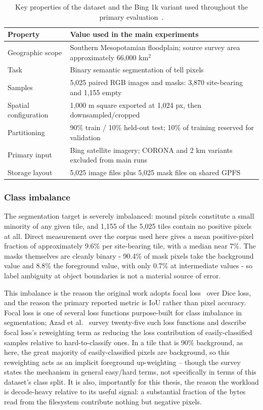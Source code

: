 \begin{table}[!ht]
\centering
\begin{tabularx}{\linewidth}{lL}
\toprule
Property & Value used in the main experiments \\
\midrule
Geographic scope & Southern Mesopotamian floodplain; source survey area approximately
66,000 km$^2$~\cite{Casini23} \\
Task & Binary semantic segmentation of tell pixels \\
Samples & 5,025 paired RGB images and masks: 3,870 site-bearing and 1,155 empty \\
Spatial configuration & 1,000 m square exported at 1,024 px, then downsampled/cropped \\
Partitioning & 90\% train / 10\% held-out test; 10\% of training reserved for validation \\
Primary input & Bing satellite imagery; CORONA and 2 km variants excluded from main runs \\
Storage layout & 5,025 image files plus 5,025 mask files on shared GPFS \\
\bottomrule
\end{tabularx}
\caption{Key properties of the dataset and the Bing 1k variant used throughout
the primary evaluation~\cite{Casini23}.}
\label{tab:dataset-overview}
\end{table}

\subsubsection{Class imbalance}

The segmentation target is severely imbalanced: mound pixels constitute a small
minority of any given tile, and 1{,}155 of the 5{,}025 tiles contain no positive
pixels at all.
Direct measurement over the corpus used here gives a mean positive-pixel fraction of
approximately 9.6\% per site-bearing tile, with a median near 7\%.
The masks themselves are cleanly binary - 90.4\% of mask pixels take the
background value and 8.8\% the foreground value, with only 0.7\% at intermediate
values - so label ambiguity at object boundaries is not a material source of error.

This imbalance is the reason the original work adopts focal loss~\cite{Lin17} over
Dice loss, and the reason the primary reported metric is IoU rather than pixel
accuracy.
Focal loss is one of several loss functions purpose-built for class imbalance in
segmentation; Azad et al.~\cite{Azad23} survey twenty-five such loss functions and
describe focal loss's reweighting term as reducing the loss contribution of
easily-classified samples relative to hard-to-classify ones.
In a tile that is 90\% background, as here, the great majority of easily-classified
pixels are background, so this reweighting acts as an implicit foreground
up-weighting -- though the survey states the mechanism in general easy/hard terms,
not specifically in terms of this dataset's class split.
It is also, importantly for this thesis, the reason the workload is decode-heavy
relative to its useful signal: a substantial fraction of the bytes read from the
filesystem contribute nothing but negative pixels.


